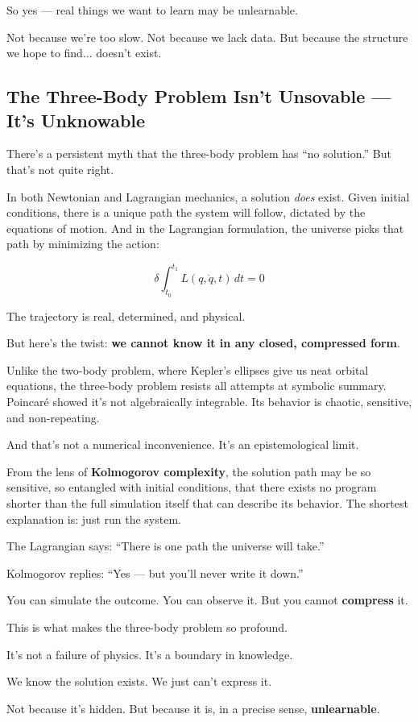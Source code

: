 \bigskip

So yes — real things we want to learn may be unlearnable.

Not because we're too slow.  
Not because we lack data.  
But because the structure we hope to find... doesn't exist.


\subsection{The Three-Body Problem Isn’t Unsovable — It’s Unknowable}

There’s a persistent myth that the three-body problem has “no solution.” But that’s not quite right.

In both Newtonian and Lagrangian mechanics, a solution \emph{does} exist. Given initial conditions, there is a unique path the system will follow, dictated by the equations of motion. And in the Lagrangian formulation, the universe picks that path by minimizing the action:

\[
\delta \int_{t_0}^{t_1} L(q, \dot{q}, t) \, dt = 0
\]

The trajectory is real, determined, and physical.

But here’s the twist: \textbf{we cannot know it in any closed, compressed form}.

Unlike the two-body problem, where Kepler’s ellipses give us neat orbital equations, the three-body problem resists all attempts at symbolic summary. Poincaré showed it’s not algebraically integrable. Its behavior is chaotic, sensitive, and non-repeating.

And that’s not a numerical inconvenience.  
It’s an epistemological limit.

\bigskip

From the lens of \textbf{Kolmogorov complexity}, the solution path may be so sensitive, so entangled with initial conditions, that there exists no program shorter than the full simulation itself that can describe its behavior. The shortest explanation is: just run the system.

\bigskip

\begin{tcolorbox}[colback=red!5!white, colframe=red!75!black, title={From Determinism to Incompressibility}]
The Lagrangian says: “There is one path the universe will take.”

Kolmogorov replies: “Yes — but you’ll never write it down.”

You can simulate the outcome.  
You can observe it.  
But you cannot \textbf{compress} it.
\end{tcolorbox}

\bigskip

This is what makes the three-body problem so profound.

It’s not a failure of physics.  
It’s a boundary in knowledge.

We know the solution exists.  
We just can’t express it.

Not because it’s hidden.  
But because it is, in a precise sense, \textbf{unlearnable}.
